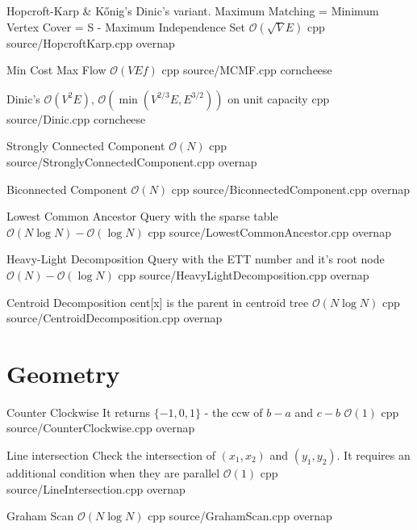 \documentclass[landscape, 10pt, a4paper, oneside, twocolumn]{extarticle}
\begin{document}

\Algorithm
{Hopcroft-Karp \& Kőnig's}
{Dinic's variant. Maximum Matching = Minimum Vertex Cover = S - Maximum Independence Set}
{$\mathcal{O}(\sqrt{V}E)$}
{cpp}
{source/HopcroftKarp.cpp}
{overnap}


\Algorithm
{Min Cost Max Flow}
{}
{$\mathcal{O}(VEf)$}
{cpp}
{source/MCMF.cpp}
{corncheese}

\Algorithm
{Dinic's}
{}
{$\mathcal{O}(V^2E)$, $\mathcal{O}(\min{(V^{2/3}E,E^{3/2})})$ on unit capacity}
{cpp}
{source/Dinic.cpp}
{corncheese}

\Algorithm
{Strongly Connected Component}
{}
{$\mathcal{O}(N)$}
{cpp}
{source/StronglyConnectedComponent.cpp}
{overnap}

\Algorithm
{Biconnected Component}
{}
{$\mathcal{O}(N)$}
{cpp}
{source/BiconnectedComponent.cpp}
{overnap}

\Algorithm
{Lowest Common Ancestor}
{Query with the sparse table}
{$\mathcal{O}(N\log{N})-\mathcal{O}(\log{N})$}
{cpp}
{source/LowestCommonAncestor.cpp}
{overnap}

\Algorithm
{Heavy-Light Decomposition}
{Query with the ETT number and it's root node}
{$\mathcal{O}(N)-\mathcal{O}(\log{N})$}
{cpp}
{source/HeavyLightDecomposition.cpp}
{overnap}

\Algorithm
{Centroid Decomposition}
{cent[x] is the parent in centroid tree}
{$\mathcal{O}(N\log{N})$}
{cpp}
{source/CentroidDecomposition.cpp}
{overnap}


\section{Geometry}

\Algorithm
{Counter Clockwise}
{It returns $\{-1, 0, 1\}$ - the ccw of $b-a$ and $c-b$}
{$\mathcal{O}(1)$}
{cpp}
{source/CounterClockwise.cpp}
{overnap}

\Algorithm
{Line intersection}
{Check the intersection of $(x_1, x_2)$ and $(y_1, y_2)$. It requires an additional condition when they are parallel}
{$\mathcal{O}(1)$}
{cpp}
{source/LineIntersection.cpp}
{overnap}

\Algorithm
{Graham Scan}
{}
{$\mathcal{O}(N\log{N})$}
{cpp}
{source/GrahamScan.cpp}
{overnap}
\end{document}
